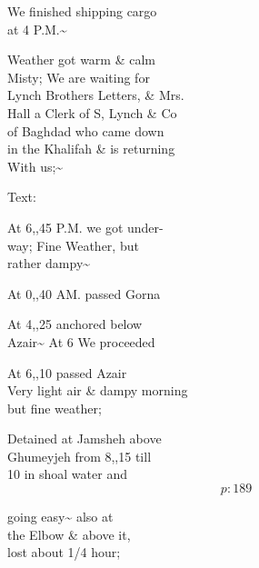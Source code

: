 \documentclass{report}
\begin{document}
	\par{
 	We finished shipping cargo\ \\at 4 P.M.\~{}\ \\
	}

	\par{
 	Weather got warm \& calm\ \\Misty; We are waiting for\ \\Lynch Brothers Letters, \& Mrs.\ \\Hall a Clerk of S, Lynch \& Co\ \\of Baghdad who came down\ \\in the Khalifah \& is returning\ \\With us;\~{}\ \\
	}

	\par{
 	Text:\ \\
	}

	\par{
 	At 6,,45 P.M. we got under-\ \\way; Fine Weather, but\ \\rather dampy\~{}\ \\
	}

	\par{
 	At 0,,40 AM. passed Gorna\ \\
	}

	\par{
 	At 4,,25 anchored below\ \\Azair\~{} At 6 We proceeded\ \\
	}

	\par{
 	At 6,,10 passed Azair\ \\Very light air \& dampy morning\ \\but fine weather;\ \\
	}

	\par{
 	Detained at Jamsheh above\ \\Ghumeyjeh from 8,,15 till\ \\10 in shoal water and\ \\
  \[p: 189 \]

	}


	\par{
 	going easy\~{} also at\ \\the Elbow \& above it,\ \\lost about 1/4 hour;\ \\
	}
\end{document}
